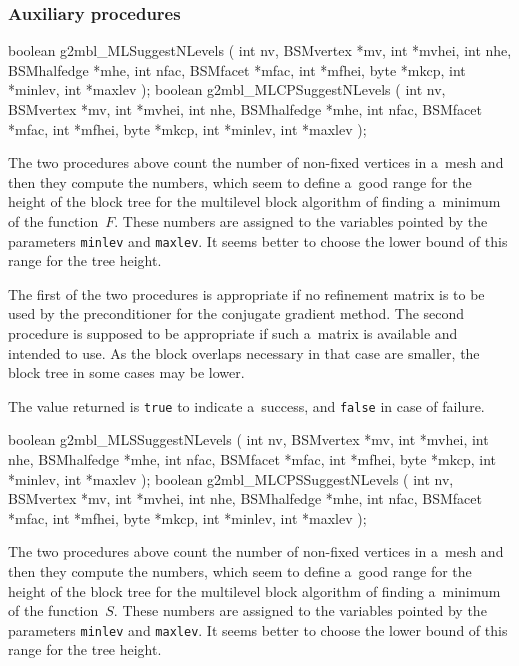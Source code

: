 \subsubsection{Auxiliary procedures}

\begin{listingC}
boolean g2mbl_MLSuggestNLevels ( int nv, BSMvertex *mv, int *mvhei,
                                 int nhe, BSMhalfedge *mhe,
                                 int nfac, BSMfacet *mfac, int *mfhei,
                                 byte *mkcp,
                                 int *minlev, int *maxlev );
boolean g2mbl_MLCPSuggestNLevels ( int nv, BSMvertex *mv, int *mvhei,
                                   int nhe, BSMhalfedge *mhe,
                                   int nfac, BSMfacet *mfac, int *mfhei,
                                   byte *mkcp,
                                   int *minlev, int *maxlev );
\end{listingC}
The two procedures above count the number of non-fixed vertices in a~mesh
and then they compute the numbers, which seem to define a~good range for the
height of the block tree for the multilevel block algorithm of finding
a~minimum of the function~$F$. These numbers are assigned to the variables
pointed by the parameters \texttt{minlev} and \texttt{maxlev}. It seems
better to choose the lower bound of this range for the tree height.

The first of the two procedures is appropriate if no refinement matrix is to
be used by the preconditioner for the conjugate gradient method. The second
procedure is supposed to be appropriate if such a~matrix is available and
intended to use. As the block overlaps necessary in that case are smaller,
the block tree in some cases may be lower.

The value returned is \texttt{true} to indicate a~success, and \texttt{false}
in case of failure.


\medskip
\begin{listingC}
boolean g2mbl_MLSSuggestNLevels (
                          int nv, BSMvertex *mv, int *mvhei,
                          int nhe, BSMhalfedge *mhe,
                          int nfac, BSMfacet *mfac, int *mfhei,
                          byte *mkcp,
                          int *minlev, int *maxlev );
boolean g2mbl_MLCPSSuggestNLevels (
                          int nv, BSMvertex *mv, int *mvhei,
                          int nhe, BSMhalfedge *mhe,
                          int nfac, BSMfacet *mfac, int *mfhei,
                          byte *mkcp,
                          int *minlev, int *maxlev );
\end{listingC}
The two procedures above count the number of non-fixed vertices in a~mesh
and then they compute the numbers, which seem to define a~good range for the
height of the block tree for the multilevel block algorithm of finding
a~minimum of the function~$S$. These numbers are assigned to the variables
pointed by the parameters \texttt{minlev} and \texttt{maxlev}. It seems
better to choose the lower bound of this range for the tree height.

